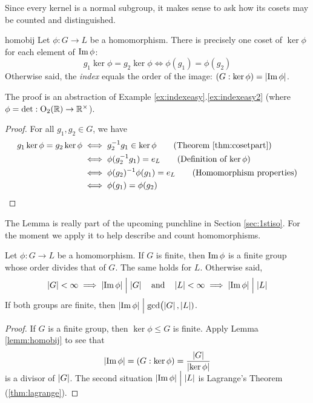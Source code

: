 
Since every kernel is a normal subgroup, it makes sense to ask how its cosets may be counted and distinguished.

\begin{lemm}{}{homobij}
	Let $\phi:G\to L$ be a homomorphism. There is precisely one coset of $\ker\phi$ for each element of $\operatorname{Im}\phi$:
	\[
		g_1\ker\phi=g_2\ker\phi
		\iff \phi(g_1)=\phi(g_2)
	\]
	Otherwise said, the \emph{index} equals the order of the image: $(G:\ker\phi)=\left| \operatorname{Im}\phi\right|$.
\end{lemm}

The proof is an abstraction of Example \ref*{ex:indexeasy}.\ref{ex:indexeasy2} (where $\phi=\det:\mathrm{O}_2(\mathbb{R})\to\mathbb{R}^\times$).

\begin{proof}
	For all $g_1,g_2\in G$, we have
	\begin{align*}
		g_1\ker\phi=g_2\ker\phi&\iff g_2^{-1}g_1\in\ker\phi \tag{Theorem \ref{thm:cosetpart}}\\
		&\iff\phi(g_2^{-1}g_1)=e_L\tag{Definition of $\ker\phi$}\\
		&\iff \phi(g_2)^{-1}\phi(g_1)=e_L\tag{Homomorphism properties}\\
		&\iff \phi(g_1)=\phi(g_2)\tag*{\qedhere}
	\end{align*}
\end{proof}

The Lemma is really part of the upcoming punchline in Section \ref{sec:1stiso}. For the moment we apply it to help describe and count homomorphisms.

\begin{thm}{}{}
	Let $\phi:G\to L$ be a homomorphism. If $G$ is finite, then $\operatorname{Im}\phi$ is a finite group whose order divides that of $G$. The same holds for $L$. Otherwise said,
	\[
		\left| G\right|<\infty
		\implies\left| \operatorname{Im}\phi\right|\Bigm| \left| G\right|
		\quad\text{and}\quad 
		\left| L\right|<\infty\implies\left| \operatorname{Im}\phi\right|\Bigm| \left| L\right|
	\]
	If both groups are finite, then $\smash[t]{\left| \operatorname{Im}\phi\right|\Bigm|\gcd\bigl(\left| G\right|,\left| L\right|)}$.
\end{thm}

\begin{proof}
	If $G$ is a finite group, then $\ker\phi\le G$ is finite. Apply Lemma \ref{lemm:homobij} to see that
	\[
		\left| \operatorname{Im}\phi\right|=(G:\ker\phi) =\smash[b]{\frac{\left| G\right|}{\left| \ker\phi\right|}}
	\]
	is a divisor of $\left| G\right|$. The second situation $\left| \operatorname{Im}\phi\right|\Bigm|\left| L\right|$ is Lagrange's Theorem (\ref{thm:lagrange}).
\end{proof}



